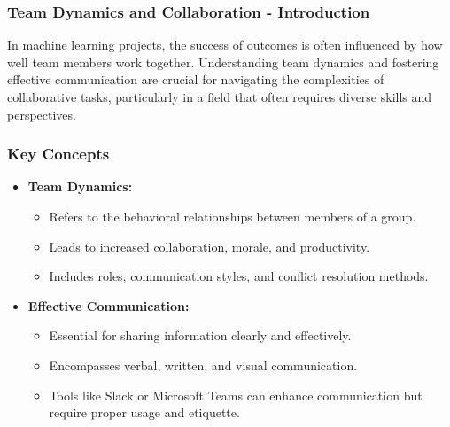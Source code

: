 \documentclass[aspectratio=169]{beamer}
\begin{document}
\begin{frame}[fragile]
    \frametitle{Team Dynamics and Collaboration - Introduction}
    In machine learning projects, the success of outcomes is often influenced by how well team members work together. 
    Understanding team dynamics and fostering effective communication are crucial for navigating the complexities of collaborative tasks, particularly in a field that often requires diverse skills and perspectives.
\end{frame}

\begin{frame}[fragile]
    \frametitle{Key Concepts}
    \begin{itemize}
        \item \textbf{Team Dynamics:} 
        \begin{itemize}
            \item Refers to the behavioral relationships between members of a group.
            \item Leads to increased collaboration, morale, and productivity.
            \item Includes roles, communication styles, and conflict resolution methods.
        \end{itemize}
        
        \item \textbf{Effective Communication:}
        \begin{itemize}
            \item Essential for sharing information clearly and effectively.
            \item Encompasses verbal, written, and visual communication.
            \item Tools like Slack or Microsoft Teams can enhance communication but require proper usage and etiquette.
        \end{itemize}
    \end{itemize}
\end{frame}
\end{document}

